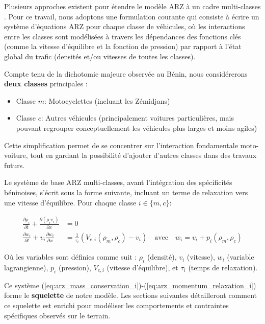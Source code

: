 Plusieurs approches existent pour étendre le modèle ARZ à un cadre multi-classes \cite{BenzoniGavageColombo2003, FanWork2015, ColomboMarcellini2020}. Pour ce travail, nous adoptons une formulation courante qui consiste à écrire un système d'équations ARZ pour chaque classe de véhicules, où les interactions entre les classes sont modélisées à travers les dépendances des fonctions clés (comme la vitesse d'équilibre et la fonction de pression) par rapport à l'état global du trafic (densités et/ou vitesses de toutes les classes).

Compte tenu de la dichotomie majeure observée au Bénin, nous considérerons \textbf{deux classes} principales :
\begin{itemize}
    \item Classe \( m \): Motocyclettes (incluant les Zémidjans)
    \item Classe \( c \): Autres véhicules (principalement voitures particulières, mais pouvant regrouper conceptuellement les véhicules plus larges et moins agiles)
\end{itemize}
Cette simplification permet de se concentrer sur l'interaction fondamentale moto-voiture, tout en gardant la possibilité d'ajouter d'autres classes dans des travaux futurs.

Le système de base ARZ multi-classes, avant l'intégration des spécificités béninoises, s'écrit sous la forme suivante, incluant un terme de relaxation vers une vitesse d'équilibre. Pour chaque classe \( i \in \{m, c\} \):

\begin{align}
    \label{eq:arz_mass_conservation_i}
    \frac{\partial \rho_i}{\partial t} + \frac{\partial (\rho_i v_i)}{\partial x} &= 0 \\
    \label{eq:arz_momentum_relaxation_i}
    \frac{\partial w_i}{\partial t} + v_i \frac{\partial w_i}{\partial x} &= \frac{1}{\tau_i} (V_{e,i}(\rho_m, \rho_c) - v_i) \quad \text{avec} \quad w_i = v_i + p_i(\rho_m, \rho_c)
\end{align}

Où les variables sont définies comme suit : \( \rho_i \) (densité), \( v_i \) (vitesse), \( w_i \) (variable lagrangienne), \( p_i \) (pression), \( V_{e,i} \) (vitesse d'équilibre), et \( \tau_i \) (temps de relaxation).

Ce système (\ref{eq:arz_mass_conservation_i})-(\ref{eq:arz_momentum_relaxation_i}) forme le \textbf{squelette} de notre modèle. Les sections suivantes détailleront comment ce squelette est enrichi pour modéliser les comportements et contraintes spécifiques observés sur le terrain.

